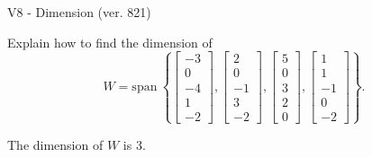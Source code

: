 \begin{exercise}
  \begin{exerciseTitle}V8 - Dimension (ver. 821)\end{exerciseTitle}
  \begin{exerciseStatement}
    Explain how to find the dimension of 
\[W=\mathrm{span}\ \left\{\left[\begin{array}{r}
-3 \\
0 \\
-4 \\
1 \\
-2
\end{array}\right] , \left[\begin{array}{r}
2 \\
0 \\
-1 \\
3 \\
-2
\end{array}\right] , \left[\begin{array}{r}
5 \\
0 \\
3 \\
2 \\
0
\end{array}\right] , \left[\begin{array}{r}
1 \\
1 \\
-1 \\
0 \\
-2
\end{array}\right]\right\}.\]



  \end{exerciseStatement}
  \begin{exerciseAnswer}
   The dimension of \(W\) is  \(3\).
  


  \end{exerciseAnswer}
\end{exercise}